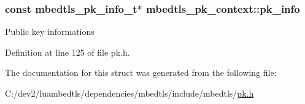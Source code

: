 \hypertarget{structmbedtls__pk__context_a3dac25bf08a411a2479107e14fa90550}{
\subsubsection[{pk\-\_\-info}]{\setlength{\rightskip}{0pt plus 5cm}const {\bf mbedtls\-\_\-pk\-\_\-info\-\_\-t}$\ast$ mbedtls\-\_\-pk\-\_\-context\-::pk\-\_\-info}}\label{structmbedtls__pk__context_a3dac25bf08a411a2479107e14fa90550}
Public key informations 

Definition at line 125 of file pk.\-h.



The documentation for this struct was generated from the following file\-:\begin{DoxyCompactItemize}
\item 
C\-:/dev2/luambedtls/dependencies/mbedtls/include/mbedtls/\hyperlink{pk_8h}{pk.\-h}\end{DoxyCompactItemize}
